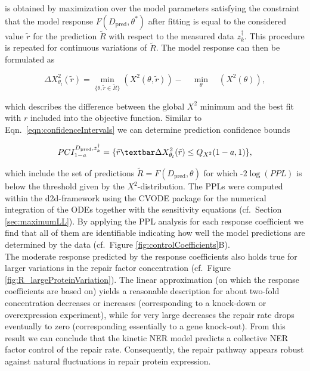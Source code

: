 is obtained by maximization over the model parameters satisfying the constraint that the model response $F(D_\text{pred}, \theta^\ast)$ after fitting is equal to the considered value $\tilde{r}$ for the prediction $\tilde{R}$ with respect to the measured data $z_k^\dag$. This procedure is repeated for continuous variations of $\tilde{R}$. The model response can then be formulated as 

\begin{equation}
\Delta X_{\theta_l}^2(\tilde{r}) = \min_{\{\theta, \tilde{r} \in \tilde{R}  \}} \left( X^2 (\theta,\tilde{r} )\right)
- \quad  \min_{\theta} \quad  \left( X^2 (\theta)\right),
\end{equation}

which describes the difference between the global $X^2$ minimum and the best fit with $r$ included into the objective function. Similar to Eqn.\ \ref{eqn:confidenceIntervals} we can determine prediction confidence bounds 

\begin{equation}
PCI_{1-a}^{D_{\text{pred}},z_k^\dag} = \{\tilde{r}\textbar \Delta X_{\theta_l}^2(\tilde{r})\leq Q_{X^2}(1-a,1)\},
\label{eqn:confidenceIntervalsPPL}
\end{equation}

which include the set of predictions $\tilde{R} = F(D_{\text{pred}},\theta)$ for which -$2\log(PPL)$ is below the threshold given by the $X^2$-distribution. The PPLs were computed within the d2d-framework \cite{Raue2013} using the CVODE package \cite{Hindmarsh2005} for the numerical integration of the ODEs together with the sensitivity equations (cf.\ Section \ref{sec:maximumLL}).
By applying the PPL analysis for each response coefficient we find that all of them are identifiable indicating how well the model predictions are determined by the data (cf.\ Figure \ref{fig:controlCoefficients}B).\\ The moderate response predicted by the response coefficients also holds true for larger variations in the repair factor concentration (cf.\ Figure \ref{fig:R_largeProteinVariation}). The linear approximation (on which the response coefficients are based on) yields a reasonable description for about two-fold concentration decreases or increases (corresponding to a knock-down or overexpression experiment), while for very large decreases the repair rate drops eventually to zero (corresponding essentially to a gene knock-out). From this result we can conclude that the kinetic NER model predicts a collective NER factor control of the repair rate. Consequently, the repair pathway appears robust against natural fluctuations in repair protein expression.  


